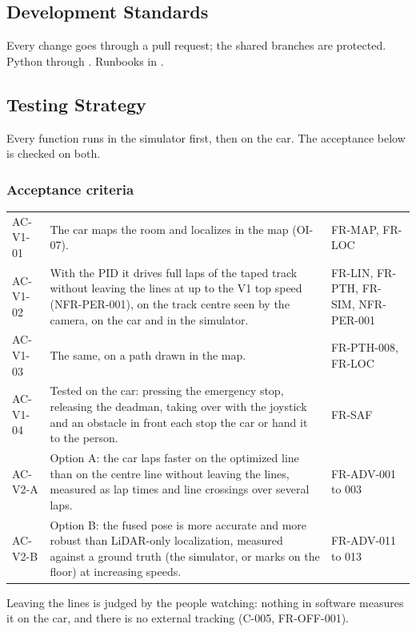\documentclass[11pt,a4paper]{article}
\begin{document}
\subsection{Development Standards}
Every change goes through a pull request; the shared branches are protected. Python through . Runbooks in .

\subsection{Testing Strategy}
Every function runs in the simulator first, then on the car. The acceptance below is checked on both.

\subsubsection{Acceptance criteria}
\begin{tabularx}{\textwidth}{@{}L{2.2cm} Y L{2.6cm}@{}}
\toprule
{} &  &  \\
\midrule
\endhead
AC-V1-01 & The car maps the room and localizes in the map (OI-07). & FR-MAP, FR-LOC \\
AC-V1-02 & With the PID it drives full laps of the taped track without leaving the lines at up to the V1 top speed (NFR-PER-001), on the track centre seen by the camera, on the car and in the simulator. & FR-LIN, FR-PTH, FR-SIM, NFR-PER-001 \\
AC-V1-03 & The same, on a path drawn in the map. & FR-PTH-008, FR-LOC \\
AC-V1-04 & Tested on the car: pressing the emergency stop, releasing the deadman, taking over with the joystick and an obstacle in front each stop the car or hand it to the person. & FR-SAF \\
AC-V2-A & Option A: the car laps faster on the optimized line than on the centre line without leaving the lines, measured as lap times and line crossings over several laps. & FR-ADV-001 to 003 \\
AC-V2-B & Option B: the fused pose is more accurate and more robust than LiDAR-only localization, measured against a ground truth (the simulator, or marks on the floor) at increasing speeds. & FR-ADV-011 to 013 \\
\bottomrule
\end{tabularx}

Leaving the lines is judged by the people watching: nothing in software measures it on the car, and there is no external tracking (C-005, FR-OFF-001).
\end{document}

